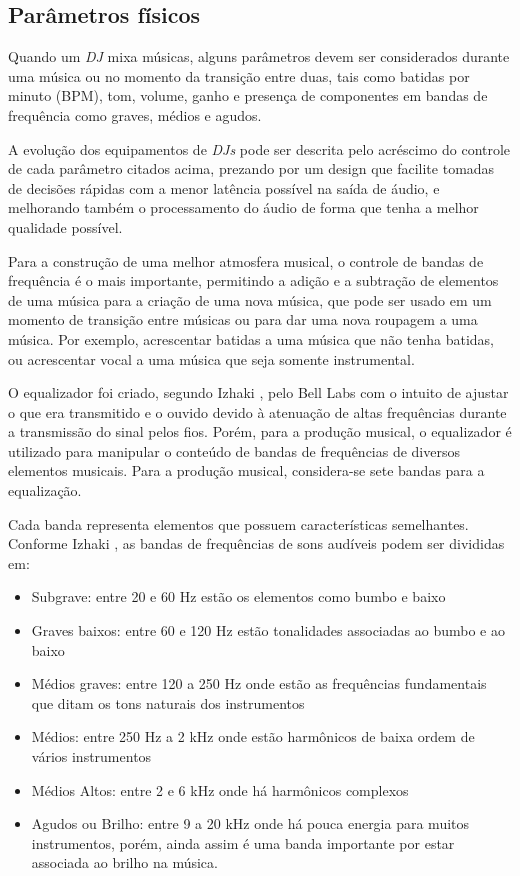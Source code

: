 \subsection{Parâmetros físicos}
Quando um \textit{DJ} mixa músicas, alguns parâmetros devem ser considerados durante uma música ou no momento da transição entre duas, tais como batidas por minuto (BPM), tom, volume, ganho e presença de componentes em bandas de frequência como graves, médios e agudos.
\par
A evolução dos equipamentos de \textit{DJs} pode ser descrita pelo acréscimo do controle de cada parâmetro citados acima, prezando por um design que facilite tomadas de decisões rápidas com a menor latência possível na saída de áudio, e melhorando também o processamento do áudio de forma que tenha a melhor qualidade possível.
\par
Para a construção de uma melhor atmosfera musical, o controle de bandas de frequência é o mais importante, permitindo a adição e a subtração de elementos de uma música para a criação de uma nova música, que pode ser usado em um momento de transição entre músicas ou para dar uma nova roupagem a uma música. Por exemplo, acrescentar batidas a uma música que não tenha batidas, ou acrescentar vocal a uma música que seja somente instrumental.
\par
O equalizador foi criado, segundo Izhaki \cite{mixing}, pelo Bell Labs com o intuito de ajustar o que era transmitido e o ouvido devido à atenuação de altas frequências durante a transmissão do sinal pelos fios. Porém, para a produção musical, o equalizador é utilizado para manipular o conteúdo de bandas de frequências de diversos elementos musicais. 
Para a produção musical, considera-se sete bandas para a equalização.
\par 
Cada banda representa elementos que possuem características semelhantes. Conforme Izhaki \cite{mixing}, as bandas de frequências de sons audíveis podem ser divididas em:


\begin{itemize}
	\item Subgrave: entre 20 e 60 Hz estão os elementos como bumbo e baixo
	\item Graves baixos: entre 60 e 120 Hz estão tonalidades associadas ao bumbo e ao baixo
	\item Médios graves: entre 120 a 250 Hz onde estão as frequências fundamentais que ditam os tons naturais dos instrumentos
	\item Médios: entre 250 Hz a 2 kHz onde estão harmônicos de baixa ordem de vários instrumentos
	\item Médios Altos: entre 2 e 6 kHz onde há harmônicos complexos
	\item Agudos ou Brilho: entre 9 a 20 kHz onde há pouca energia para muitos instrumentos, porém, ainda assim é uma banda importante por estar associada ao brilho na música.
\end{itemize}

